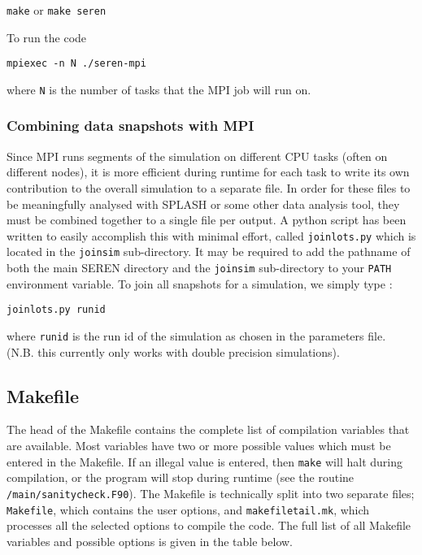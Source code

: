 \documentclass[a4paper]{article}
\newcommand{\var}[1]{\texttt{#1}}
\begin{document}
\var{make} or \var{make seren} \newline

\noindent To run the code \newline

\var{mpiexec -n N ./seren-mpi} \newline

\noindent where {\var N} is the number of tasks that the MPI job will run on. 


\subsubsection{Combining data snapshots with MPI}
Since MPI runs segments of the simulation on different CPU tasks (often on different nodes), it is more efficient during runtime for each task to write its own contribution to the overall simulation to a separate file.  In order for these files to be meaningfully analysed with SPLASH or some other data analysis tool, they must be combined together to a single file per output.  A python script has been written to easily accomplish this with minimal effort, called \var{joinlots.py} which is located in the \var{joinsim} sub-directory.  It may be required to add the pathname of both the main SEREN directory and the \var{joinsim} sub-directory to your \var{PATH} environment variable.  To join all snapshots for a simulation, we simply type : \newline

\var{joinlots.py runid} \newline

\noindent where \var{runid} is the run id of the simulation as chosen in the parameters file.  (N.B. this currently only works with double precision simulations).


\newpage



\subsection{Makefile} \label{SS:MAKEFILE}
The head of the Makefile contains the complete list of compilation variables that are available.  Most variables have two or more possible values which must be entered in the Makefile.  If an illegal value is entered, then \var{make} will halt during compilation, or the program will stop during runtime (see the routine \var{/main/sanitycheck.F90}).  The Makefile is technically split into two separate files; \var{Makefile}, which contains the user options, and \var{makefiletail.mk}, which processes all the selected options to compile the code.  The full list of all Makefile variables and possible options is given in the table below. 
\newline
\end{document}
